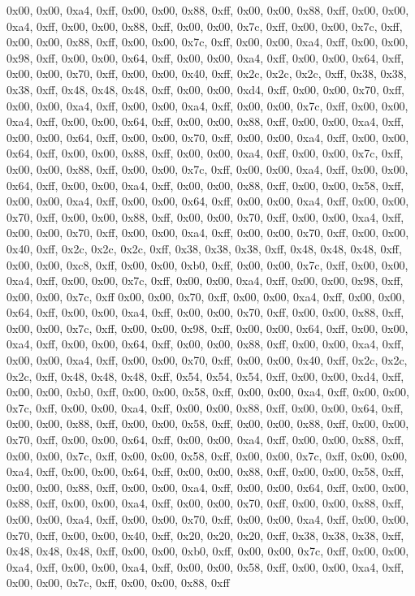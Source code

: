 0x00, 0x00, 0xa4, 0xff, 0x00, 0x00, 0x88, 0xff, 0x00, 0x00, 0x88, 0xff, 0x00, 0x00, 0xa4, 0xff, 0x00, 0x00, 0x88, 0xff, 0x00, 0x00, 0x7c, 0xff, 0x00, 0x00, 0x7c, 0xff, 0x00, 0x00, 0x88, 0xff, 0x00, 0x00, 0x7c, 0xff, 0x00, 0x00, 0xa4, 0xff, 0x00, 0x00, 0x98, 0xff, 0x00, 0x00, 0x64, 0xff, 0x00, 0x00, 0xa4, 0xff, 0x00, 0x00, 0x64, 0xff, 0x00, 0x00, 0x70, 0xff, 0x00, 0x00, 0x40, 0xff, 0x2c, 0x2c, 0x2c, 0xff, 0x38, 0x38, 0x38, 0xff, 0x48, 0x48, 0x48, 0xff, 0x00, 0x00, 0xd4, 0xff, 0x00, 0x00, 0x70, 0xff, 0x00, 0x00, 0xa4, 0xff, 0x00, 0x00, 0xa4, 0xff, 0x00, 0x00, 0x7c, 0xff, 0x00, 0x00, 0xa4, 0xff, 0x00, 0x00, 0x64, 0xff, 0x00, 0x00, 0x88, 0xff, 0x00, 0x00, 0xa4, 0xff, 0x00, 0x00, 0x64, 0xff, 0x00, 0x00, 0x70, 0xff, 0x00, 0x00, 0xa4, 0xff, 0x00, 0x00, 0x64, 0xff, 0x00, 0x00, 0x88, 0xff, 0x00, 0x00, 0xa4, 0xff, 0x00, 0x00, 0x7c, 0xff, 0x00, 0x00, 0x88, 0xff, 0x00, 0x00, 0x7c, 0xff, 0x00, 0x00, 0xa4, 0xff, 0x00, 0x00, 0x64, 0xff, 0x00, 0x00, 0xa4, 0xff, 0x00, 0x00, 0x88, 0xff, 0x00, 0x00, 0x58, 0xff, 0x00, 0x00, 0xa4, 0xff, 0x00, 0x00, 0x64, 0xff, 0x00, 0x00, 0xa4, 0xff, 0x00, 0x00, 0x70, 0xff, 0x00, 0x00, 0x88, 0xff, 0x00, 0x00, 0x70, 0xff, 0x00, 0x00, 0xa4, 0xff, 0x00, 0x00, 0x70, 0xff, 0x00, 0x00, 0xa4, 0xff, 0x00, 0x00, 0x70, 0xff, 0x00, 0x00, 0x40, 0xff, 0x2c, 0x2c, 0x2c, 0xff, 0x38, 0x38, 0x38, 0xff, 0x48, 0x48, 0x48, 0xff, 0x00, 0x00, 0xc8, 0xff, 0x00, 0x00, 0xb0, 0xff, 0x00, 0x00, 0x7c, 0xff, 0x00, 0x00, 0xa4, 0xff, 0x00, 0x00, 0x7c, 0xff, 0x00, 0x00, 0xa4, 0xff, 0x00, 0x00, 0x98, 0xff, 0x00, 0x00, 0x7c, 0xff
0x00, 0x00, 0x70, 0xff, 0x00, 0x00, 0xa4, 0xff, 0x00, 0x00, 0x64, 0xff, 0x00, 0x00, 0xa4, 0xff, 0x00, 0x00, 0x70, 0xff, 0x00, 0x00, 0x88, 0xff, 0x00, 0x00, 0x7c, 0xff, 0x00, 0x00, 0x98, 0xff, 0x00, 0x00, 0x64, 0xff, 0x00, 0x00, 0xa4, 0xff, 0x00, 0x00, 0x64, 0xff, 0x00, 0x00, 0x88, 0xff, 0x00, 0x00, 0xa4, 0xff, 0x00, 0x00, 0xa4, 0xff, 0x00, 0x00, 0x70, 0xff, 0x00, 0x00, 0x40, 0xff, 0x2c, 0x2c, 0x2c, 0xff, 0x48, 0x48, 0x48, 0xff, 0x54, 0x54, 0x54, 0xff, 0x00, 0x00, 0xd4, 0xff, 0x00, 0x00, 0xb0, 0xff, 0x00, 0x00, 0x58, 0xff, 0x00, 0x00, 0xa4, 0xff, 0x00, 0x00, 0x7c, 0xff, 0x00, 0x00, 0xa4, 0xff, 0x00, 0x00, 0x88, 0xff, 0x00, 0x00, 0x64, 0xff, 0x00, 0x00, 0x88, 0xff, 0x00, 0x00, 0x58, 0xff, 0x00, 0x00, 0x88, 0xff, 0x00, 0x00, 0x70, 0xff, 0x00, 0x00, 0x64, 0xff, 0x00, 0x00, 0xa4, 0xff, 0x00, 0x00, 0x88, 0xff, 0x00, 0x00, 0x7c, 0xff, 0x00, 0x00, 0x58, 0xff, 0x00, 0x00, 0x7c, 0xff, 0x00, 0x00, 0xa4, 0xff, 0x00, 0x00, 0x64, 0xff, 0x00, 0x00, 0x88, 0xff, 0x00, 0x00, 0x58, 0xff, 0x00, 0x00, 0x88, 0xff, 0x00, 0x00, 0xa4, 0xff, 0x00, 0x00, 0x64, 0xff, 0x00, 0x00, 0x88, 0xff, 0x00, 0x00, 0xa4, 0xff, 0x00, 0x00, 0x70, 0xff, 0x00, 0x00, 0x88, 0xff, 0x00, 0x00, 0xa4, 0xff, 0x00, 0x00, 0x70, 0xff, 0x00, 0x00, 0xa4, 0xff, 0x00, 0x00, 0x70, 0xff, 0x00, 0x00, 0x40, 0xff, 0x20, 0x20, 0x20, 0xff, 0x38, 0x38, 0x38, 0xff, 0x48, 0x48, 0x48, 0xff, 0x00, 0x00, 0xb0, 0xff, 0x00, 0x00, 0x7c, 0xff, 0x00, 0x00, 0xa4, 0xff, 0x00, 0x00, 0xa4, 0xff, 0x00, 0x00, 0x58, 0xff, 0x00, 0x00, 0xa4, 0xff, 0x00, 0x00, 0x7c, 0xff, 0x00, 0x00, 0x88, 0xff

